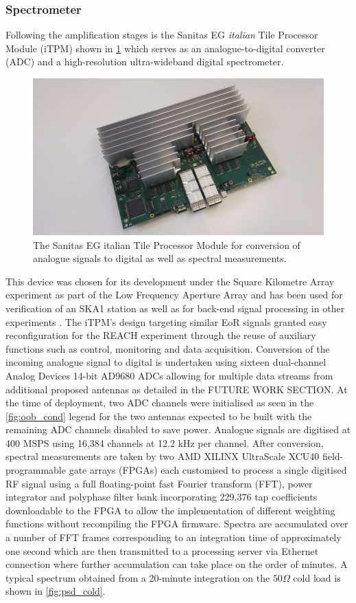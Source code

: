 \subsubsection{Spectrometer}
Following the amplification stages is the Sanitas EG \textit{italian} Tile Processor Module (iTPM) shown in \cref{fig:tpm} which serves as an analogue-to-digital converter (ADC) and a high-resolution ultra-wideband digital spectrometer.
\begin{figure}
    \centering
    \includegraphics[scale=0.4]{tpm}
    \caption{The Sanitas EG italian Tile Processor Module for conversion of analogue signals to digital as well as spectral measurements.}
    \label{fig:tpm}
\end{figure}
This device was chosen for its development under the Square Kilometre Array experiment as part of the Low Frequency Aperture Array and has been used for verification of an SKA1 station as well as for back-end signal processing in other experiments \citep{itpm}. The iTPM's design targeting similar EoR signals granted easy reconfiguration for the REACH experiment through the reuse of auxiliary functions such as control, monitoring and data acquisition. Conversion of the incoming analogue signal to digital is undertaken using sixteen dual-channel Analog Devices 14-bit AD9680 ADCs allowing for multiple data streams from additional proposed antennas as detailed in the FUTURE WORK SECTION. At the time of deployment, two ADC channels were initialised as seen in the \cref{fig:oob_cond} legend for the two antennas expected to be built with the remaining ADC channels disabled to save power. Analogue signals are digitised at 400 MSPS using 16,384 channels at 12.2 kHz per channel. After conversion, spectral measurements are taken by two AMD XILINX UltraScale XCU40 field-programmable gate arrays (FPGAs) each customised to process a single digitised RF signal using a full floating-point fast Fourier transform (FFT), power integrator and polyphase filter bank incorporating 229,376 tap coefficients downloadable to the FPGA to allow the implementation of different weighting functions without recompiling the FPGA firmware. Spectra are accumulated over a number of FFT frames corresponding to an integration time of approximately one second which are then transmitted to a processing server via Ethernet connection where further accumulation can take place on the order of minutes. A typical spectrum obtained from a 20-minute integration on the $50 \Omega$ cold load is shown in \cref{fig:psd_cold}.
